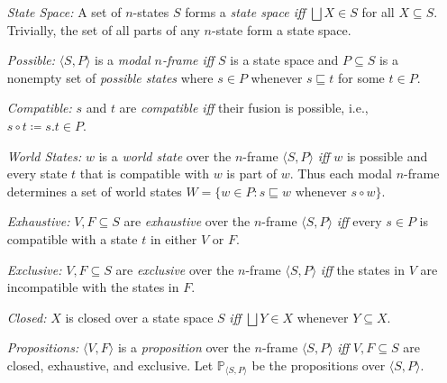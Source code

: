 \documentclass[a4paper, 11pt]{article} %
\newcommand{\tuple}[1]{\langle#1\rangle} %
\newcommand{\set}[1]{\lbrace#1\rbrace} %
\renewcommand{\P}[0]{\mathbb{P}}
\begin{document}
\begin{enumerate}
\begin{itemize}
    \end{itemize}
  \item[\it State Space:] A set of $n$-states $S$ forms a \textit{state space iff} $\bigsqcup X\in S$ for all $X\subseteq S$. Trivially, the set of all parts of any $n$-state form a state space.
  \item[\it Possible:] $\tuple{S,P}$ is a \textit{modal $n$-frame iff} $S$ is a state space and $P\subseteq S$ is a nonempty set of \textit{possible states} where $s\in P$ whenever $s\sqsubseteq t$ for some $t\in P$.
  \item[\it Compatible:] $s$ and $t$ are \textit{compatible iff} their fusion is possible, i.e., $s\circ t\coloneq s.t\in P$.
  \item[\it World States:] $w$ is a \textit{world state} over the $n$-frame $\tuple{S,P}$ \textit{iff} $w$ is possible and every state $t$ that is compatible with $w$ is part of $w$. 
    Thus each modal $n$-frame determines a set of world states $W=\set{w\in P: s\sqsubseteq w \text{ whenever } s\circ w}$.
  \item[\it Exhaustive:] $V,F\subseteq S$ are \textit{exhaustive} over the $n$-frame $\tuple{S,P}$ \textit{iff} every $s\in P$ is compatible with a state $t$ in either $V$ or $F$.
  \item[\it Exclusive:] $V,F\subseteq S$ are \textit{exclusive} over the $n$-frame $\tuple{S,P}$ \textit{iff} the states in $V$ are incompatible with the states in $F$.
  \item[\it Closed:] $X$ is closed over a state space $S$ \textit{iff} $\bigsqcup Y\in X$ whenever $Y\subseteq X$.
  \item[\it Propositions:] $\tuple{V,F}$ is a \textit{proposition} over the $n$-frame $\tuple{S,P}$ \textit{iff} $V,F\subseteq S$ are closed, exhaustive, and exclusive.
    Let $\P_{\tuple{S,P}}$ be the propositions over $\tuple{S,P}$.
\end{enumerate}
\end{document}
